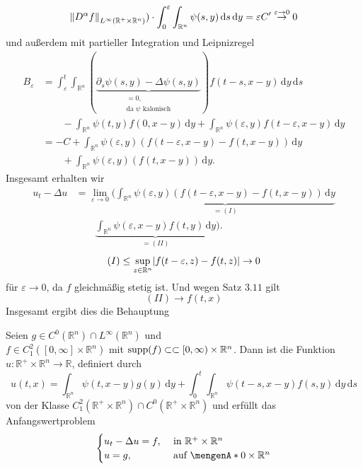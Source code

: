 \begin{beweis}
\[{{		 \norm{D^{\alpha}f}_{L^{\infty}(\mathbb{R}^{+} \times \mathbb{R}^n)}}}) \cdot \int_{0}^{\varepsilon} \int_{\mathbb{R}^n}^{} 
		 \psi(s,y) \,\mathrm{d}s \,\mathrm{d}y = \varepsilon C' \stackrel{\varepsilon \to 0}{\to } 0
	\]
	und außerdem mit partieller Integration und Leipnizregel
	\begin{align*}
			B _{\varepsilon} &= \int_{\varepsilon}^{t} \int_{\mathbb{R}^n}^{}
		 (\underset{\substack{=0, \\ \text{da $\psi$ kalonisch}}}{\underbrace{ \partial_s \psi(s,y) - \Delta \psi(s,y)}})
		 f(t-s,x-y) \,\mathrm{d}y \,\mathrm{d}s \\ & \qquad - \int_{\mathbb{R}^n}^{} \psi(t,y) f(0,x-y) \,\mathrm{d}y 
		 + \int_{\mathbb{R}^n}^{} \psi(\varepsilon,y)f(t-\varepsilon,x-y) \,\mathrm{d}y \\
		 &= -C + \int_{\mathbb{R}^n}^{} \psi(\varepsilon,y)(f(t-\varepsilon,x-y)-f(t,x-y)) \,\mathrm{d}y \\
		 & \qquad + \int_{\mathbb{R}^n}^{} \psi(\varepsilon,y)(f(t,x-y)) \,\mathrm{d}y.
	\end{align*}
	Insgesamt erhalten wir
	\begin{align*}
		u_t - \Delta u &= \lim_{\varepsilon \to 0} ( \underset{=(I)}{\underbrace{\int_{\mathbb{R}^n}^{} \psi(\varepsilon,y)(f(t-\varepsilon,x-y)-f(t,x-y)) 
		\,\mathrm{d}y}} \\ & \qquad \underset{=(II)}{\underbrace{\int_{\mathbb{R}^n}^{} \psi(\varepsilon,x-y) f(t,y) \,\mathrm{d}y}} ).
	\end{align*}
	\[
		(I) \leq \sup_{z \in \mathbb{R}^n} \lvert f(t-\varepsilon,z)-f(t,z)\rvert \to 0
	\]
	für $\varepsilon \to 0$, da $f$ gleichmäßig stetig ist. Und wegen Satz $3.11$ gilt
	\[
		(II) \to f(t,x)
	\]
	Insgesamt ergibt dies die Behauptung
\end{beweis}
\begin{satz}
	Seien $g \in C^0(\mathbb{R}^n) \cap L^{\infty}(\mathbb{R}^n)$ und \\ $f \in C_1^2([0,\infty]\times \mathbb{R}^n)$ mit $\operatorname{supp}(f) \subset \subset [0,\infty) \times \mathbb{R}^n$. Dann ist die Funktion $u: \mathbb{R}^{+} \times \mathbb{R}^n \to \mathbb{R}$, definiert durch
	\[
		u(t,x)= \int_{\mathbb{R}^n}^{} \psi(t,x-y)g(y) \,\mathrm{d}y + \int_{0}^{t}\int_{\mathbb{R}^n}^{} \psi(t-s,x-y)f(s,y) \,\mathrm{d}y \,\mathrm{d}s
	\]
	von der Klasse $C_1^2(\mathbb{R}^{+} \times \mathbb{R}^n) \cap C^0(\mathbb{R}^{+} \times \mathbb{R}^n)$ und erfüllt das Anfangswertproblem
	\[
		\begin{cases}
			u_t- \Delta u =f, &\text{ in }\mathbb{R}^{+} \times \mathbb{R}^n\\
			u = g, &\text{ auf } \set{0} \times \mathbb{R}^n
		\end{cases}
	\]
\end{satz}

